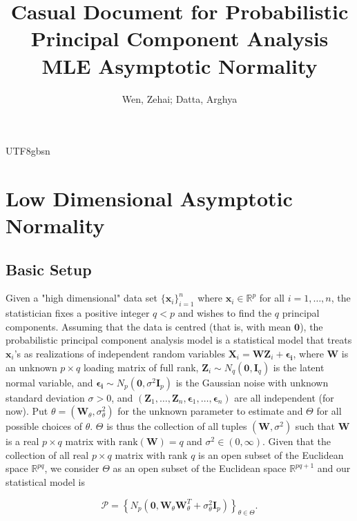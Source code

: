 \documentclass[12pt]{report}
\title{Casual Document for Probabilistic Principal Component Analysis MLE Asymptotic Normality}
\author{Wen, Zehai; Datta, Arghya}
\date{\DTMnow}
\newcommand{\bracket}[1]{\left ( #1 \right )}
\newcommand{\curly}[1]{\left \{ #1 \right \} }
\theoremstyle{plain}
\theoremstyle{definition}
\begin{document}
\begin{CJK*}{UTF8}{gbsn}
\maketitle

\setcounter{tocdepth}{0}
\tableofcontents

\chapter{Low Dimensional Asymptotic Normality}

\section{Basic Setup}\label{sec:basic_setup}

Given a "high dimensional" data set $\{\bm{x}_i\}_{i=1}^n$
where $\bm{x}_i \in \mathbb{R}^p$ for all $i = 1, \ldots, n$,
the statistician fixes a positive integer $q < p$ 
and wishes to find the $q$ principal components.
Assuming that the data is centred (that is, with mean $\bm{0}$),
the probabilistic principal component analysis model
is a statistical model that
treats $\bm{x}_i$'s as realizations 
of independent random variables $\bm{X}_i = \bm{W}\bm{Z}_i + \bm{\epsilon_i}$,
where $\bm{W}$ is an unknown $p \times q$ loading matrix of full rank, 
$\bm{Z}_i \sim N_q\bracket{\bm{0}, \bm{I}_q}$ is the latent normal variable,
and $\bm{\epsilon_i} \sim N_p\bracket{\bm{0}, \sigma^2\bm{I}_p}$
is the Gaussian noise with unknown standard deviation $\sigma > 0$,
and $(\bm{Z}_1, \ldots, \bm{Z}_n, \bm{\epsilon}_1, \ldots, \bm{\epsilon}_n)$
are all independent (for now). 
Put $\theta = (\bm{W}_{\theta}, \sigma_{\theta}^2)$ for the unknown 
parameter to estimate
and $\Theta$ for all possible choices of $\theta$.
$\Theta$ is thus the collection of all tuples $(\bm{W}, \sigma^2)$
such that $\bm{W}$ is a real $p \times q$ matrix with $\text{rank}(\bm{W}) = q$
and $\sigma^2 \in (0, \infty)$.
Given that the collection of all real $p \times q$ matrix with rank $q$
is an open subset of the Euclidean space $\mathbb{R}^{pq}$,
we consider $\Theta$ as an open subset of the Euclidean space $\mathbb{R}^{pq+1}$
and our statistical model is 

\begin{equation}\label{eq:original_model}
  \mathcal{P} = \curly{N_p\bracket{\bm{0}, \bm{W}_{\theta}\bm{W}_{\theta}^T + \sigma_{\theta}^2\bm{I}_p}}_{\theta \in \Theta}.
\end{equation}


\end{CJK*}
\end{document}

